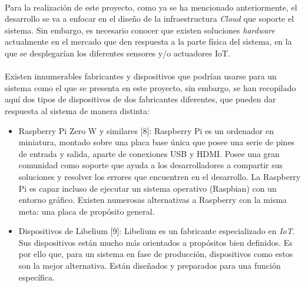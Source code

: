\documentclass[../../memoria.tex]{subfiles}
\begin{document}
\paragraph{}
Para la realización de este proyecto, como ya se ha mencionado anteriormente, el desarrollo se va a enfocar en el diseño de la infraestructura \textit{Cloud} que soporte el sistema. Sin embargo, es necesario conocer que existen soluciones \textit{hardware} actualmente en el mercado que den respuesta a la parte física del sistema, en la que se desplegarían los diferentes sensores y/o actuadores IoT.

\paragraph{}
Existen innumerables fabricantes y dispositivos que podrían usarse para un sistema como el que se presenta en este proyecto, sin embargo, se han recopilado aquí dos tipos de dispositivos de dos fabricantes diferentes, que pueden dar respuesta al sistema de manera distinta:

\begin{itemize}

    \item Raspberry Pi Zero W y similares [8]: Raspberry Pi es un ordenador en miniatura, montado sobre una placa base única que posee una serie de pines de entrada y salida, aparte de conexiones USB y HDMI. Posee una gran comunidad como soporte que ayuda a los desarrolladores a compartir sus soluciones y resolver los errores que encuentren en el desarrollo. La Raspberry Pi es capaz incluso de ejecutar un sistema operativo (Raspbian) con un entorno gráfico. Existen numerosas alternativas a Raspberry con la misma meta: una placa de propósito general.

    \item Dispositivos de Libelium [9]: Libelium es un fabricante especializado en \textit{IoT}. Sus dispositivos están mucho más orientados a propósitos bien definidos. Es por ello que, para un sistema en fase de producción, dispositivos como estos son la mejor alternativa. Están diseñados y preparados para una función específica.
\end{itemize}
\end{document}
